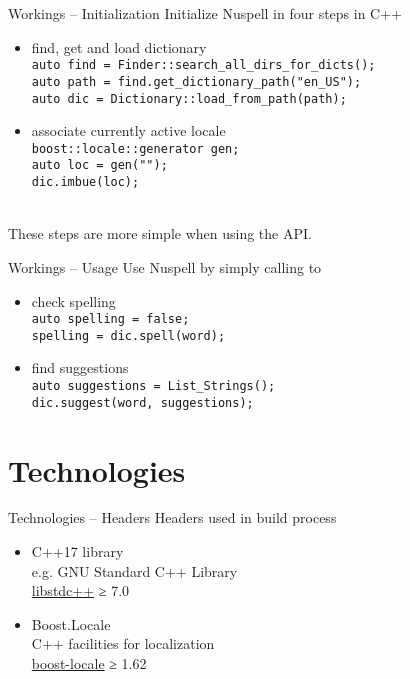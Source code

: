 \documentclass{beamer}
\begin{document}
\begin{frame}{Workings – Initialization}
Initialize Nuspell in four steps in C++\\\mbox{}
\begin{itemize}
\item find, get and load dictionary\\
\texttt{auto find = Finder::\alert{search\_all\_dirs\_for\_dicts}();\\
auto path = find.\alert{get\_dictionary\_path}("en\_US");\\
auto dic = Dictionary::\alert{load\_from\_path}(path);}
\\\mbox{}
\item associate currently active locale\\
\texttt{boost::locale::generator gen;\\
auto loc = gen("");\\
dic.\alert{imbue}(loc);}
\end{itemize}
\mbox{}\\
These steps are more simple when using the API.
\end{frame}

\begin{frame}{Workings – Usage}
Use Nuspell by simply calling to\\\mbox{}
\begin{itemize}
\item check spelling\\
\texttt{auto spelling = false;\\
spelling = dic.\alert{spell}(word);}
\\\mbox{}
\item find suggestions\\
\texttt{auto suggestions = List\_Strings();\\
dic.\alert{suggest}(word, suggestions);}
\end{itemize}
\end{frame}



\section{Technologies}

\begin{frame}{Technologies – Headers}
Headers used in build process
\\\mbox{}
\begin{itemize}
\item C++17 library\\
e.g. GNU Standard C++ Library\\
\href{https://gcc.gnu.org/}{libstdc++} ≥ 7.0
\\\mbox{}
\item Boost.Locale\\
C++ facilities for localization\\
\href{https://www.boost.org/doc/libs/1_69_0/libs/locale/doc/html/index.html}{boost-locale} ≥ 1.62
\end{itemize}
\end{frame}
\end{document}
